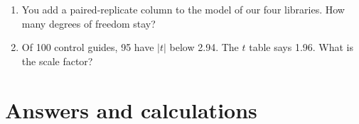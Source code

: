 \documentclass[12pt]{article}
\begin{document}
\begin{enumerate}[label=\textbf{Q\arabic*.},leftmargin=2.6em,itemsep=6pt]
\item You add a paired-replicate column to the model of our four libraries.
How many degrees of freedom stay?

\item Of 100 control guides, 95 have $|t|$ below 2.94. The $t$ table says
1.96. What is the scale factor?
\end{enumerate}

\newpage
\section{Answers and calculations}
\end{document}
